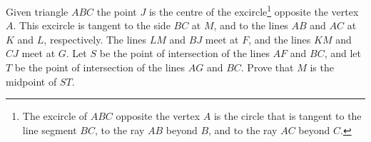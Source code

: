 Given triangle $ABC$ the point $J$ is the centre of the excircle\footnote{The excircle of $ABC$ opposite the vertex $A$ is the circle that is tangent to the line segment $BC$,  to the ray $AB$ beyond $B$,  and to the ray $AC$ beyond $C$.} opposite the vertex $A.$ This excircle is tangent to the side $BC$ at $M$,  and to the lines $AB$ and $AC$ at $K$ and $L$,  respectively. The lines $LM$ and $BJ$ meet at $F$,  and the lines $KM$ and $CJ$ meet at $G.$ Let $S$ be the point of intersection of the lines $AF$ and $BC$,  and let $T$ be the point of intersection of the lines $AG$ and $BC.$ Prove that $M$ is the midpoint of $ST.$
